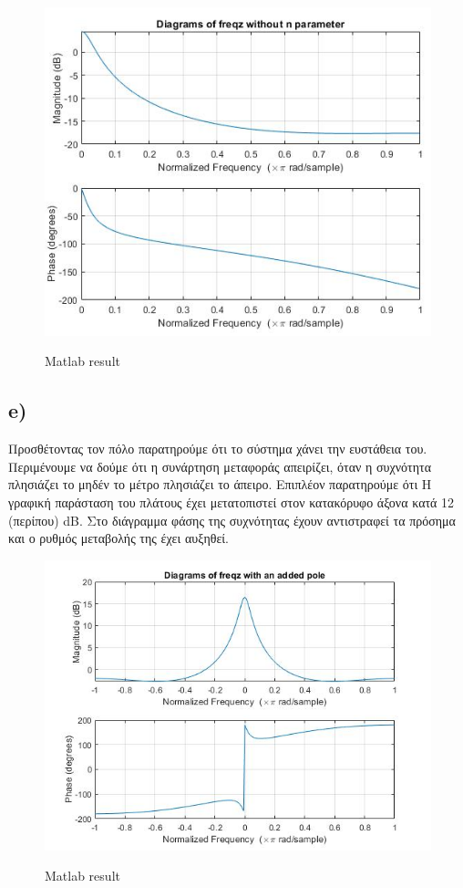 \documentclass[11pt]{article}
\begin{document}
\begin{figure}[H]
    \centering
   \includegraphics[scale=0.9]{photos/1d-2-magnitude-phase_diagram.png} \\
    \caption{Matlab result}
\end{figure}

\subsection*{e)}
Προσθέτοντας τον πόλο παρατηρούμε ότι το σύστημα χάνει την ευστάθεια του. Περιμένουμε να δούμε ότι η συνάρτηση μεταφοράς απειρίζει, όταν η συχνότητα πλησιάζει το μηδέν το μέτρο πλησιάζει το άπειρο. Επιπλέον παρατηρούμε ότι Η γραφική παράσταση του πλάτους έχει μετατοπιστεί στον κατακόρυφο άξονα κατά 12 (περίπου) dB. Στο διάγραμμα φάσης της συχνότητας έχουν αντιστραφεί τα πρόσημα και ο ρυθμός μεταβολής της έχει αυξηθεί.

\begin{figure}[H]
    \centering
   \includegraphics[scale=0.8]{photos/1e-diagram.jpg} \\
    \caption{Matlab result}
\end{figure}
\end{document}
